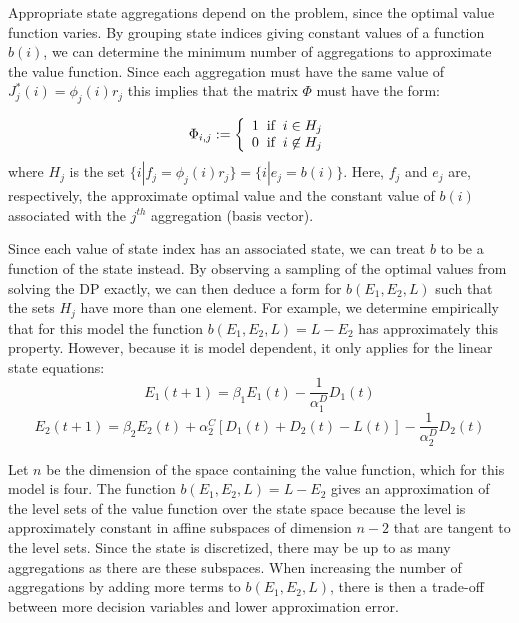 \documentclass[conference]{IEEEtran}
\begin{document}
    Appropriate state aggregations depend on the problem, since the optimal value function varies. By grouping state indices giving constant values of a function $b(i)$, we can determine the minimum number of aggregations to approximate the value function. Since each aggregation must have the same value of $J^{*}_{j}(i) = \phi_{j}(i)r_{j}$ this implies that the matrix $\Phi$ must have the form:
    
    \begin{displaymath}
        \Phi_{i,j}:=\left\{
            \begin{array}{l}
            1 \hspace{0.2cm} \text{if} \hspace{0.2cm} i\in H_{j}\\
            0 \hspace{0.2cm} \text{if} \hspace{0.2cm} i\not\in H_{j}
            \end{array}
            \right.
    \end{displaymath}where $H_{j}$ is the set $\{i|f_{j} = \phi_{j}(i)r_{j}\}=\{i|e_{j} = b(i)\}$. Here, $f_{j}$ and $e_{j}$ are, respectively, the approximate optimal value and the constant value of $b(i)$ associated with the $j^{th}$ aggregation (basis vector).
    
    Since each value of state index has an associated state, we can treat $b$ to be a function of the state instead. By observing a sampling of the optimal values from solving the DP exactly, we can then deduce a form for $b(E_{1},E_{2},L)$ such that the sets $H_{j}$ have more than one element. For example, we determine empirically that for this model the function $b(E_{1},E_{2},L)=L-E_{2}$ has approximately this property. However, because it is model dependent, it only applies for the linear state equations:
	\begin{displaymath}E_{1}(t+1)=\beta_{1}E_{1}(t)-\frac{1}{\alpha_{1}^{D}}D_{1}(t)\end{displaymath}
	\begin{displaymath}E_{2}(t+1)=\beta_{2}E_{2}(t)+\alpha_{2}^{C}[D_{1}(t)+D_{2}(t)-L(t)]-\frac{1}{\alpha_{2}^{D}}D_{2}(t)\end{displaymath}
	
	Let $n$ be the dimension of the space containing the value function, which for this model is four. The function $b(E_{1},E_{2},L)=L-E_{2}$ gives an approximation of the level sets of the value function over the state space because the level is approximately constant in affine subspaces of dimension $n-2$ that are tangent to the level sets. Since the state is discretized, there may be up to as many aggregations as there are these subspaces. When increasing the number of aggregations by adding more terms to $b(E_{1},E_{2},L)$, there is then a trade-off between more decision variables and lower approximation error. %
	
\end{document}
